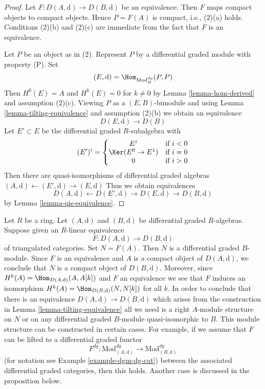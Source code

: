 \begin{proof}
Let $F : D(A, \text{d}) \to D(B, \text{d})$ be an equivalence.
Then $F$ maps compact objects to compact objects. Hence $P = F(A)$ is
compact, i.e., (2)(a) holds. Conditions (2)(b) and (2)(c) are immediate
from the fact that $F$ is an equivalence.

\medskip\noindent
Let $P$ be an object as in (2). Represent $P$ by a
differential graded module with property (P). Set
$$
(E, \text{d}) = \Hom_{\text{Mod}^{dg}_B}(P, P)
$$
Then $H^0(E) = A$ and $H^k(E) = 0$ for $k \not = 0$ by
Lemma \ref{lemma-hom-derived} and assumption (2)(c).
Viewing $P$ as a $(E, B)$-bimodule and using
Lemma \ref{lemma-tilting-equivalence} and assumption (2)(b)
we obtain an equivalence
$$
D(E, \text{d}) \to D(B)
$$
Let $E' \subset E$ be the differential graded $R$-subalgebra
with
$$
(E')^i = \left\{
\begin{matrix}
E^i & \text{if }i < 0 \\
\Ker(E^0 \to E^1) & \text{if }i = 0 \\
0 & \text{if }i > 0
\end{matrix}
\right.
$$
Then there are quasi-isomorphisms of differential graded
algebras $(A, \text{d}) \leftarrow (E', \text{d}) \rightarrow (E, \text{d})$
Thus we obtain equivalences
$$
D(A, \text{d}) \leftarrow D(E', \text{d}) \rightarrow D(E, \text{d})
\rightarrow D(B, \text{d})
$$
by Lemma \ref{lemma-qis-equivalence}.
\end{proof}

\begin{remark}
\label{remark-lift-equivalence-to-dga}
Let $R$ be a ring. Let $(A, \text{d})$ and $(B, \text{d})$ be differential
graded $R$-algebras. Suppose given an $R$-linear equivalence
$$
F : D(A, \text{d}) \longrightarrow D(B, \text{d})
$$
of triangulated categories. Set $N = F(A)$. Then $N$ is a differential
graded $B$-module. Since $F$ is an equivalence and $A$ is a compact
object of $D(A, \text{d})$, we conclude that $N$ is a compact object
of $D(B, \text{d})$. Moreover, since
$H^k(A) = \Hom_{D(A, \text{d})}(A, A[k])$ and $F$ an equivalence
we see that $F$ induces an isomorphism
$H^k(A) = \Hom_{D(B, \text{d})}(N, N[k])$ for all $k$.
In order to conclude that there is an equivalence
$D(A, \text{d}) \longrightarrow D(B, \text{d})$ which
arises from the construction in
Lemma \ref{lemma-tilting-equivalence}
all we need is a right $A$-module structure on $N$ or on any
differential graded $B$-module quasi-isomorphic to $B$.
This module structure can be constructed in certain cases.
For example, if we assume that $F$ can be lifted to a
differential graded functor
$$
F^{dg} :
\text{Mod}^{dg}_{(A, \text{d})}
\longrightarrow
\text{Mod}^{dg}_{(B, \text{d})}
$$
(for notation see Example \ref{example-dgm-dg-cat})
between the associated differential graded categories,
then this holds. Another case is discussed in the proposition below.
\end{remark}


